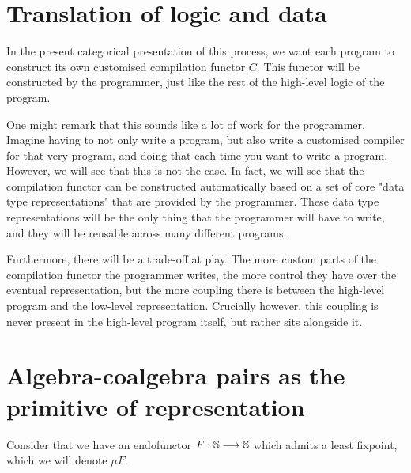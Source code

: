 \section{Translation of logic and data}

In the present categorical presentation of this process, we want each program
to construct its own customised compilation functor $C$. This functor will be
constructed by the programmer, just like the rest of the high-level logic of
the program.

One might remark that this sounds like a lot of work for the programmer.
Imagine having to not only write a program, but also write a customised
compiler for that very program, and doing that each time you want to write a
program. However, we will see that this is not the case. In fact, we will see
that the compilation functor can be constructed automatically based on a set of
core "data type representations" that are provided by the programmer. These
data type representations will be the only thing that the programmer will have
to write, and they will be reusable across many different programs.

Furthermore, there will be a trade-off at play. The more custom parts of the
compilation functor the programmer writes, the more control they have over the
eventual representation, but the more coupling there is between the high-level
program and the low-level representation. Crucially however, this coupling is
never present in the high-level program itself, but rather sits alongside it.

\section{Algebra-coalgebra pairs as the primitive of representation}

Consider that we have an endofunctor $F : \mathbb{S} \longrightarrow \mathbb{S}$ which admits a least
fixpoint, which we will denote $\mu F$.

